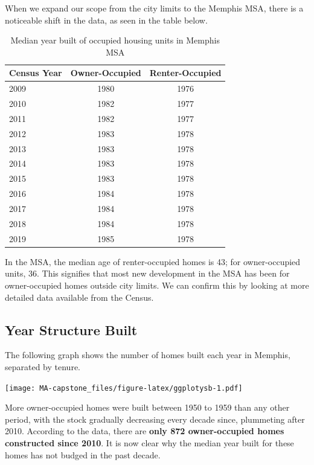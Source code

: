 \documentclass[
]{book}
\begin{document}
When we expand our scope from the city limits to the Memphis MSA, there is a noticeable shift in the data, as seen in the table below.

\begin{table}

\caption{\label{tab:tbl-medyrbltmsa}Median year built of occupied housing units in Memphis MSA}
\centering
\begin{tabular}[t]{l|c|c}
\hline
Census Year & Owner-Occupied & Renter-Occupied\\
\hline
2009 & 1980 & 1976\\
\hline
2010 & 1982 & 1977\\
\hline
2011 & 1982 & 1977\\
\hline
2012 & 1983 & 1978\\
\hline
2013 & 1983 & 1978\\
\hline
2014 & 1983 & 1978\\
\hline
2015 & 1983 & 1978\\
\hline
2016 & 1984 & 1978\\
\hline
2017 & 1984 & 1978\\
\hline
2018 & 1984 & 1978\\
\hline
2019 & 1985 & 1978\\
\hline
\end{tabular}
\end{table}

In the MSA, the median age of renter-occupied homes is 43; for owner-occupied units, 36. This signifies that most new development in the MSA has been for owner-occupied homes outside city limits. We can confirm this by looking at more detailed data available from the Census.

\hypertarget{year-structure-built}{%
\subsection{Year Structure Built}\label{year-structure-built}}

The following graph shows the number of homes built each year in Memphis, separated by tenure.

\texttt{[image: MA-capstone\_files/figure-latex/ggplotysb-1.pdf]}

More owner-occupied homes were built between 1950 to 1959 than any other period, with the stock gradually decreasing every decade since, plummeting after 2010. According to the data, there are \textbf{only 872 owner-occupied homes constructed since 2010}. It is now clear why the median year built for these homes has not budged in the past decade.
\end{document}
